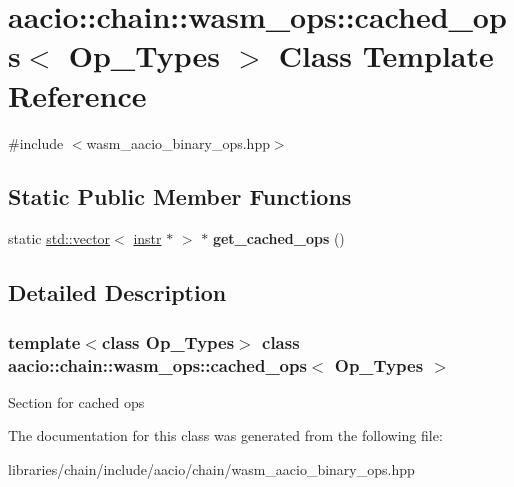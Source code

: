 \hypertarget{classaacio_1_1chain_1_1wasm__ops_1_1cached__ops}{}\section{aacio\+:\+:chain\+:\+:wasm\+\_\+ops\+:\+:cached\+\_\+ops$<$ Op\+\_\+\+Types $>$ Class Template Reference}
\label{classaacio_1_1chain_1_1wasm__ops_1_1cached__ops}


{\ttfamily \#include $<$wasm\+\_\+aacio\+\_\+binary\+\_\+ops.\+hpp$>$}

\subsection*{Static Public Member Functions}
\begin{DoxyCompactItemize}
\item 
\mbox{\label{classaacio_1_1chain_1_1wasm__ops_1_1cached__ops_a279526678ade938b46579392bfb2f73b}} 
static \mbox{\hyperlink{classstd_1_1vector}{std\+::vector}}$<$ \mbox{\hyperlink{structaacio_1_1chain_1_1wasm__ops_1_1instr}{instr}} $\ast$ $>$ $\ast$ {\bfseries get\+\_\+cached\+\_\+ops} ()
\end{DoxyCompactItemize}


\subsection{Detailed Description}
\subsubsection*{template$<$class Op\+\_\+\+Types$>$\newline
class aacio\+::chain\+::wasm\+\_\+ops\+::cached\+\_\+ops$<$ Op\+\_\+\+Types $>$}

Section for cached ops 

The documentation for this class was generated from the following file\+:\begin{DoxyCompactItemize}
\item 
libraries/chain/include/aacio/chain/wasm\+\_\+aacio\+\_\+binary\+\_\+ops.\+hpp\end{DoxyCompactItemize}
